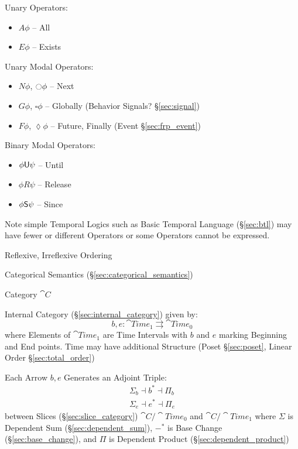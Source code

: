 Unary Operators:
\begin{itemize}
  \item $A\phi$ -- All
  \item $E\phi$ -- Exists
\end{itemize}

Unary Modal Operators:
\begin{itemize}
  \item $N\phi$, $\ocircle\phi$ -- Next
  \item $G\phi$, $\square\phi$ -- Globally (Behavior
    Signals? \S\ref{sec:signal}) %
  \item $F\phi$, $\lozenge\phi$ -- Future, Finally (Event
    \S\ref{sec:frp_event})
\end{itemize}

Binary Modal Operators:
\begin{itemize}
  \item $\phi \mathsf{U} \psi$ -- Until
  \item $\phi R \psi$ -- Release
  \item $\phi \mathsf{S} \psi$ -- Since
\end{itemize}

\fist Note simple Temporal Logics such as Basic Temporal Language
(\S\ref{sec:btl}) may have fewer or different Operators or some
Operators cannot be expressed.

Reflexive, Irreflexive Ordering


\asterism


Categorical Semantics (\S\ref{sec:categorical_semantics})

Category $\cat{C}$

Internal Category (\S\ref{sec:internal_category}) given by:
\[
  b,e : \cat{Time}_1 \rightrightarrows \cat{Time}_0
\]
where Elements of $\cat{Time}_1$ are Time Intervals with $b$ and $e$
marking Beginning and End points. Time may have additional Structure
(Poset \S\ref{sec:poset}, Linear Order \S\ref{sec:total_order})

Each Arrow $b,e$ Generates an Adjoint Triple:
\begin{align*}
  \Sigma_b \dashv b^* \dashv \Pi_b \\
  \Sigma_e \dashv e^* \dashv \Pi_e
\end{align*}
between Slices (\S\ref{sec:slice_category}) $\cat{C}/\cat{Time}_0$ and
$\cat{C}/\cat{Time}_1$ where $\Sigma$ is Dependent Sum
(\S\ref{sec:dependent_sum}), $-^*$ is Base Change
(\S\ref{sec:base_change}), and $\Pi$ is Dependent Product
(\S\ref{sec:dependent_product})

